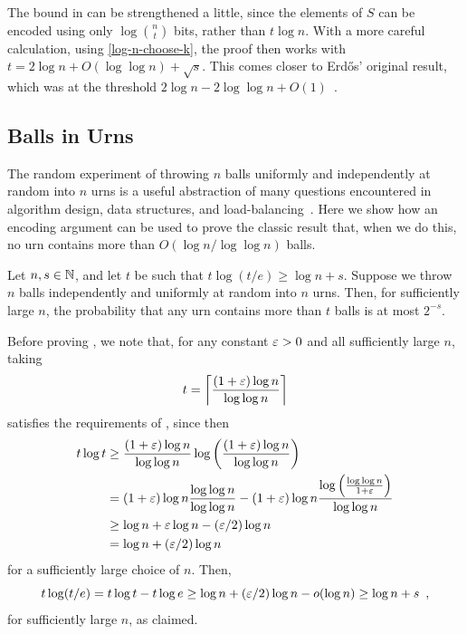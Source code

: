 \documentclass[prodmode,acmcsur]{acmsmall}
\begin{document}
\begin{rem}
  The bound in  can be strengthened a little,
  since the elements of $S$ can be encoded using only
  $\log\binom{n}{t}$ bits, rather than $t\log n$.  With a more careful
  calculation, using \eqref{log-n-choose-k}, the proof then works with
  $t = 2\log n +O(\log\log n) + \sqrt{s}$. This comes closer to Erdős'
  original result, which was at the threshold $2\log n - 2\log\log n +
  O(1)$~\cite{erdos:some}.
\end{rem}


\subsection{Balls in Urns}

The random experiment of  throwing $n$ balls uniformly and
independently at random into $n$ urns is a useful abstraction of many
questions encountered in algorithm design, data structures, and 
load-balancing~\cite{mitzenmacher.upfal:probability,motwani.raghavan:randomized}.  Here we
show how an encoding argument can be used to prove the classic result
that, when we do this, no urn contains more than $O(\log n/\log\log
n)$ balls.

\begin{thm}
  Let $n, s \in \mathbb{N}$, and let $t$ be such that $t\log(t/e) \ge \log n + s$.
  Suppose we
  throw $n$ balls independently and uniformly at random into $n$
  urns. Then, for sufficiently large $n$, the probability that any urn
  contains more than $t$ balls is at most $2^{-s}$.
\end{thm}

Before proving , we note that, for any constant $\varepsilon >0$
and all sufficiently large $n$, taking
\[
  t = {\left\lceil \frac{(1+\varepsilon)\log n}{\log\log n} \right\rceil}
\] 
satisfies the requirements of ,  since then
\begin{align*}
  t \log t &\ge \frac{(1 + \varepsilon) \log n}{\log \log n} \log \left( \frac{(1 + \varepsilon) \log n}{\log \log n}\right) \\
  &= (1 + \varepsilon) \log n \frac{\log \log n}{\log \log n} - (1 + \varepsilon) \log n \frac{\log \left(\frac{\log \log n}{1 + \varepsilon}\right)}{\log \log n} \\
  &\geq \log n + \varepsilon \log n - (\varepsilon/2) \log n \\
  &= \log n + (\varepsilon/2) \log n
\end{align*}
for 
a sufficiently large choice of $n$. Then,
\[
  t \log (t/e) = t \log t - t \log e \ge \log n + (\varepsilon/2) \log n 
  - o(\log n) \ge \log n + s \enspace ,
\]
for sufficiently large $n$, as claimed.
\end{document}
